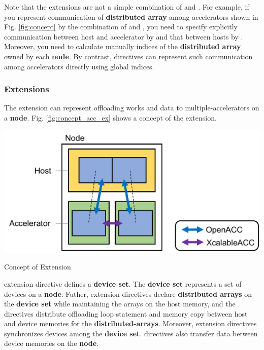 Note that 
the {\XMP} extensions are not a simple combination of {\XMP} and {\OACC}.
For example, 
if you represent communication of {\bf distributed array} among accelerators shown in Fig. \ref{fig:concept} by the combination of {\XMP} and {\OACC},
you need to specify explicitly communication between host and accelerator by {\OACC} and that between hosts by {\XMP}.
Moreover,
you need to calculate manually indices of the {\bf distributed array} owned by each {\bf node}.
By contrast,
{\XACC} directives can represent such communication among accelerators directly using global indices.

\subsubsection{{\OACC} Extensions}
The {\OACC} extension can represent offloading works and data to multiple-accelerators on a {\bf node}.
Fig. \ref{fig:concept_acc_ex} shows a concept of the {\OACC} extension.

\begin{myfigure}
\includegraphics[scale=0.5,clip]{figs/concept_acc_ext.pdf}
  \caption{Concept of {\OACC} Extension}\label{fig:concept_acc_ex}
\end{myfigure}

{\OACC} extension directive defines a {\bf device set}.
The {\bf device set} represents a set of devices on a {\bf node}.
Futher, {\OACC} extension directives declare {\bf distributed arrays} on the {\bf device set} while maintaining the arrays on the host memory, and the directives distribute offloading loop statement and memory copy between host and device memories for the {\bf distributed-arrays}.
Moreover, {\OACC} extension directives synchronizes devices among the {\bf device set}.
{\XACC} directives also transfer data between device memories on the {\bf node}.

